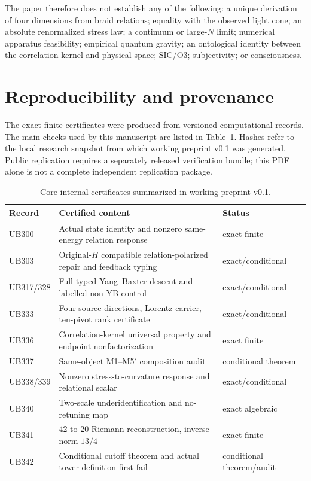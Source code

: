 \documentclass[11pt]{article}
\theoremstyle{definition}
\theoremstyle{remark}
\begin{document}
The paper therefore does not establish any of the following: a unique derivation of four dimensions from braid relations; equality with the observed light cone; an absolute renormalized stress law; a continuum or large-$N$ limit; numerical apparatus feasibility; empirical quantum gravity; an ontological identity between the correlation kernel and physical space; SIC/O3; subjectivity; or consciousness.

\section{Reproducibility and provenance}

The exact finite certificates were produced from versioned computational records. The main checks used by this manuscript are listed in Table~\ref{tab:certificates}. Hashes refer to the local research snapshot from which working preprint v0.1 was generated. Public replication requires a separately released verification bundle; this PDF alone is not a complete independent replication package.

\begin{table}[ht]
\centering
\small
\caption{Core internal certificates summarized in working preprint v0.1.}
\label{tab:certificates}
\begin{tabularx}{\linewidth}{@{}lXl@{}}
\toprule
Record & Certified content & Status\\
\midrule
UB300 & Actual state identity and nonzero same-energy relation response & exact finite\\
UB303 & Original-$H$ compatible relation-polarized repair and feedback typing & exact/conditional\\
UB317/328 & Full typed Yang--Baxter descent and labelled non-YB control & exact/conditional\\
UB333 & Four source directions, Lorentz carrier, ten-pivot rank certificate & exact/conditional\\
UB336 & Correlation-kernel universal property and endpoint nonfactorization & exact finite\\
UB337 & Same-object M1--M5$'$ composition audit & conditional theorem\\
UB338/339 & Nonzero stress-to-curvature response and relational scalar & exact/conditional\\
UB340 & Two-scale underidentification and no-retuning map & exact algebraic\\
UB341 & 42-to-20 Riemann reconstruction, inverse norm $13/4$ & exact finite\\
UB342 & Conditional cutoff theorem and actual tower-definition first-fail & conditional theorem/audit\\
\bottomrule
\end{tabularx}
\end{table}
\end{document}
